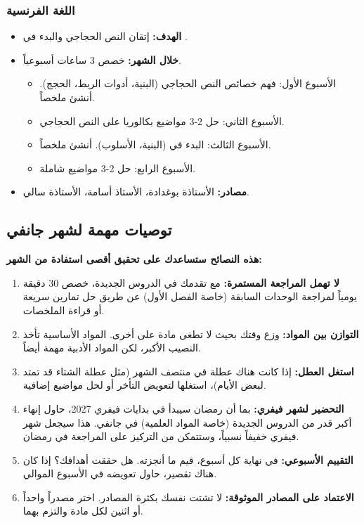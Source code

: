 \documentclass[12pt,a4paper]{book}
\newcommand{\importantAr}[1]{%
	\begin{important}
		\bfseries #1
	\end{important}
}
\begin{document}
	\subsubsection*{اللغة الفرنسية}
	\begin{itemize}
		\item \textbf{الهدف:} إتقان النص الحجاجي  والبدء في \newline {}.
		\item \textbf{خلال الشهر:} خصص 3 ساعات أسبوعياً.
		\begin{itemize}
			\item الأسبوع الأول: فهم خصائص النص الحجاجي (البنية، أدوات الربط، الحجج). أنشئ ملخصاً.
			\item الأسبوع الثاني: حل 2-3 مواضيع بكالوريا على النص الحجاجي.
			\item الأسبوع الثالث: البدء في  (البنية، الأسلوب). أنشئ ملخصاً.
			\item الأسبوع الرابع: حل 2-3 مواضيع شاملة.
		\end{itemize}
		\item \textbf{مصادر:} الأستاذة بوغدادة، الأستاذ أسامة، الأستاذة سالي.
	\end{itemize}
	
	\subsection{توصيات مهمة لشهر جانفي}
	\label{sec:random-tips5}
	
	\importantAr{هذه النصائح ستساعدك على تحقيق أقصى استفادة من الشهر:}
	\begin{enumerate}
		\item \textbf{لا تهمل المراجعة المستمرة:} مع تقدمك في الدروس الجديدة، خصص 30 دقيقة يومياً لمراجعة الوحدات السابقة (خاصة الفصل الأول) عن طريق حل تمارين سريعة أو قراءة الملخصات.
		\item \textbf{التوازن بين المواد:} وزع وقتك بحيث لا تطغى مادة على أخرى. المواد الأساسية تأخذ النصيب الأكبر، لكن المواد الأدبية مهمة أيضاً.
		\item \textbf{استغل العطل:} إذا كانت هناك عطلة في منتصف الشهر (مثل عطلة الشتاء قد تمتد لبعض الأيام)، استغلها لتعويض التأخر أو لحل مواضيع إضافية.
		\item \textbf{التحضير لشهر فيفري:} بما أن رمضان سيبدأ في بدايات فيفري 2027، حاول إنهاء أكبر قدر من الدروس الجديدة (خاصة المواد العلمية) في جانفي. هذا سيجعل شهر فيفري خفيفاً نسبياً، وستتمكن من التركيز على المراجعة في رمضان.
		\item \textbf{التقييم الأسبوعي:} في نهاية كل أسبوع، قيم ما أنجزته. هل حققت أهدافك؟ إذا كان هناك تقصير، حاول تعويضه في الأسبوع الموالي.
		\item \textbf{الاعتماد على المصادر الموثوقة:} لا تشتت نفسك بكثرة المصادر. اختر مصدراً واحداً أو اثنين لكل مادة والتزم بهما.
	\end{enumerate}
	
\end{document}
